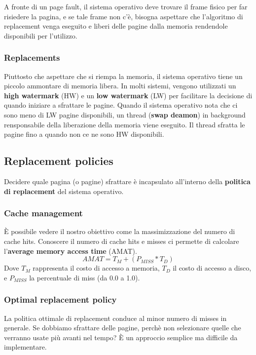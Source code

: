 \documentclass[12pt, letterpaper]{article}
\begin{document}
				A fronte di un page fault, il sistema operativo deve trovare il frame fisico per far risiedere la pagina, e se tale frame non c'è, bisogna aspettare che l'algoritmo di replacement venga eseguito e liberi delle pagine dalla memoria rendendole disponibili per l'utilizzo.
			
			\subsubsection{Replacements}
				Piuttosto che aspettare che si riempa la memoria, il sistema operativo tiene un piccolo ammontare di memoria libera. In molti sistemi, vengono utilizzati un \textbf{high watermark} (HW) e un \textbf{low watermark} (LW) per facilitare la decisione di quando iniziare a sfrattare le pagine. Quando il sistema operativo nota che ci sono meno di LW pagine disponibili, un thread (\textbf{swap deamon}) in background rensponsabile della liberazione della memoria viene eseguito. Il thread sfratta le pagine fino a quando non ce ne sono HW disponibili. 
			
				
		\subsection{Replacement policies}
			Decidere quale pagina (o pagine) sfrattare è incapsulato all'interno della \textbf{politica di replacement} del sistema operativo.
			
			\subsubsection{Cache management}
				È possibile vedere il nostro obiettivo come la massimizzazione del numero di cache hits. Conoscere il numero di cache hits e misses ci permette di calcolare l'\textbf{average memory access time} (AMAT).
				$$AMAT = T_M + (P_{MISS}*T_D)$$
				Dove $T_M$ rappresenta il costo di accesso a memoria, $T_D$ il costo di accesso a disco, e $P_{MISS}$ la percentuale di miss (da 0.0 a 1.0). 
				
			\subsubsection{Optimal replacement policy}
				La politica ottimale di replacement conduce al minor numero di misses in generale. Se dobbiamo sfrattare delle pagine, perchè non selezionare quelle che verranno usate più avanti nel tempo? È un approccio semplice ma difficile da implementare.
				
\end{document}
